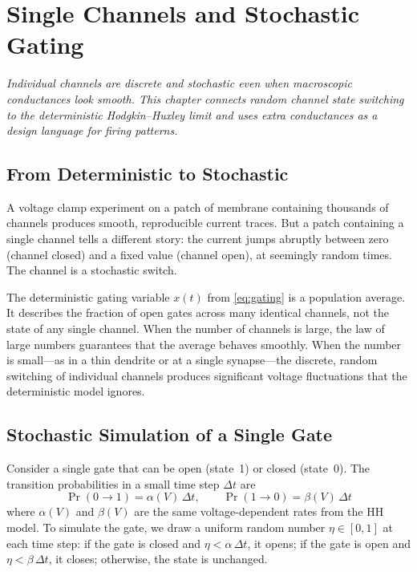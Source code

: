 \chapter{Single Channels and Stochastic Gating}
\label{ch:single-channels}

\textit{Individual channels are discrete and stochastic even when macroscopic conductances look smooth. This chapter connects random channel state switching to the deterministic Hodgkin--Huxley limit and uses extra conductances as a design language for firing patterns.}

\section{From Deterministic to Stochastic}
\label{sec:deterministic-to-stochastic}

A voltage clamp experiment on a patch of membrane containing thousands of channels produces smooth, reproducible current traces. But a patch containing a single channel tells a different story: the current jumps abruptly between zero (channel closed) and a fixed value (channel open), at seemingly random times. The channel is a stochastic switch.

The deterministic gating variable $x(t)$ from \cref{eq:gating} is a population average. It describes the fraction of open gates across many identical channels, not the state of any single channel. When the number of channels is large, the law of large numbers guarantees that the average behaves smoothly. When the number is small---as in a thin dendrite or at a single synapse---the discrete, random switching of individual channels produces significant voltage fluctuations that the deterministic model ignores.

\section{Stochastic Simulation of a Single Gate}
\label{sec:stochastic-gate}

Consider a single gate that can be open (state~1) or closed (state~0). The transition probabilities in a small time step $\Delta t$ are
%
\begin{equation}
  \Pr(0 \to 1) = \alpha(V)\,\Delta t, \qquad
  \Pr(1 \to 0) = \beta(V)\,\Delta t
  \label{eq:gate-transitions}
\end{equation}
%
where $\alpha(V)$ and $\beta(V)$ are the same voltage-dependent rates from the HH model. To simulate the gate, we draw a uniform random number $\eta \in [0, 1]$ at each time step: if the gate is closed and $\eta < \alpha\,\Delta t$, it opens; if the gate is open and $\eta < \beta\,\Delta t$, it closes; otherwise, the state is unchanged.

